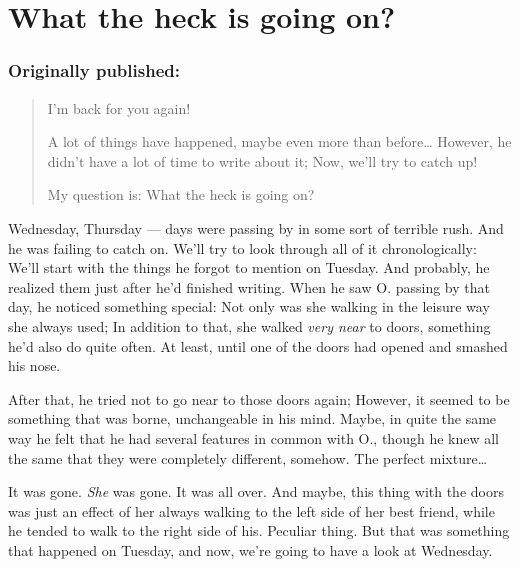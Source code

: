 \chapter{What the heck is going on?}
\label{cha:what-heck-going}
\subsection*{Originally published: }
\begin{quote}
I'm back for you again!

A lot of things have happened, maybe even more than before\ldots
However, he didn't have a lot of time to write about it; Now, we'll try to catch up!

My question is: What the heck is going on?
\end{quote}

Wednesday, Thursday --- days were passing by in some sort of terrible rush. 
And he was failing to catch on. 
We'll try to look through all of it chronologically: We'll start with the things he forgot to mention on Tuesday. 
And probably, he realized them just after he'd finished writing. 
When he saw O. passing by that day, he noticed something special: Not only was she walking in the leisure way she always used; In addition to that, she walked \emph{very near} to doors, something he'd also do quite often. 
At least, until one of the doors had opened and smashed his nose.

After that, he tried not to go near to those doors again; However, it seemed to be something that was borne, unchangeable in his mind. 
Maybe, in quite the same way he felt that he had several features in common with O., though he knew all the same that they were completely different, somehow. 
The perfect mixture\ldots

It was gone. \emph{She} was gone. It was all over. 
And maybe, this thing with the doors was just an effect of her always walking to the left side of her best friend, while he tended to walk to the right side of his. 
Peculiar thing.
But that was something that happened on Tuesday, and now, we're going to have a look at Wednesday. 

